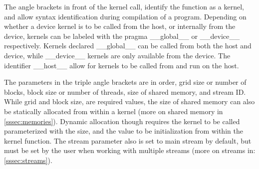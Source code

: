 
The angle brackets in front of the kernel call, identify the function as a kernel,
and allow syntax  identification during compilation of a program.  Depending on
whether a device kernel is to be called from the host, or internally from the device,
kernels can be labeled with the pragma \_\_global\_\_ or \_\_device\_\_  respectively.
Kernels declared \_\_global\_\_ can be called from both the host and device, while \_\_device\_\_
kernels are only available from the device. %
The identifier \_\_host\_\_ allow for kernels to be called from and run on the host.

The parameters in the triple angle brackets are in order, grid size or number of blocks,
block size or number of threads, size of shared memory, and stream ID.  While grid and block size,
are required values, the size of shared memory can also be statically allocated from within
a kernel (more on shared memory in \ref{sssec:memories}).  Dynamic allocation though requires the kernel to be called parameterized with
the size, and the value to be initialization from within the kernel function.  The stream
parameter also is set to main stream by default, but must be set by the user when
working with multiple streams (more on streams in: \ref{sssec:streams}).

